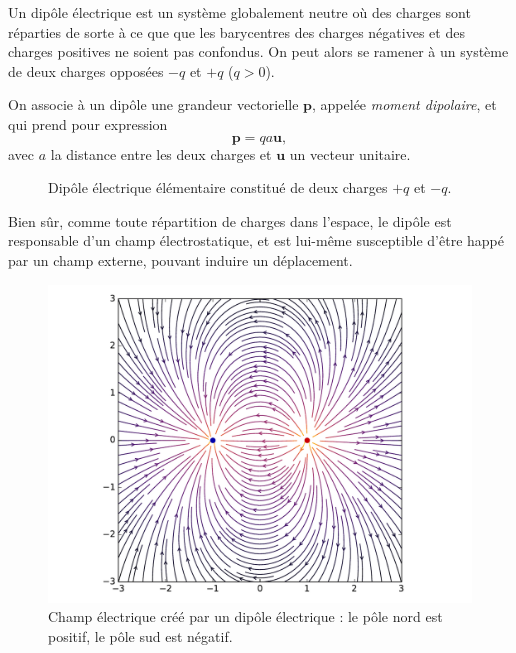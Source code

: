 \documentclass{article}
\newcommand{\vv}[1]{\symbf{#1}}
\theoremstyle{definition}
\theoremstyle{remark}
\begin{document}
Un dipôle électrique est un système globalement neutre où des charges sont réparties de sorte à ce que que les barycentres des charges négatives et des charges positives ne soient pas confondus. On peut alors se ramener à un système de deux charges opposées $-q$ et $+q$ ($q>0$).

On associe à un dipôle une grandeur vectorielle $\vv{p}$, appelée \textit{moment dipolaire}, et qui prend pour expression
	\[ 
	\vv{p} = qa\vv{u},
	 \]
avec $a$ la distance entre les deux charges et $\vv{u}$ un vecteur unitaire.

\begin{figure}[h]
	\centering
	\caption{Dipôle électrique élémentaire constitué de deux charges $+q$ et $-q$.}
\end{figure}

Bien sûr, comme toute répartition de charges dans l'espace, le dipôle est responsable d'un champ électrostatique, et est lui-même susceptible d'être happé par un champ externe, pouvant induire un déplacement.

\begin{figure}[h]
	\centering
	\includegraphics[width=\textwidth]{parts/electrostat/Champ_dipole.pdf}
	\caption{Champ électrique créé par un dipôle électrique : le pôle nord est positif, le pôle sud est négatif.}
\end{figure}
\end{document}
